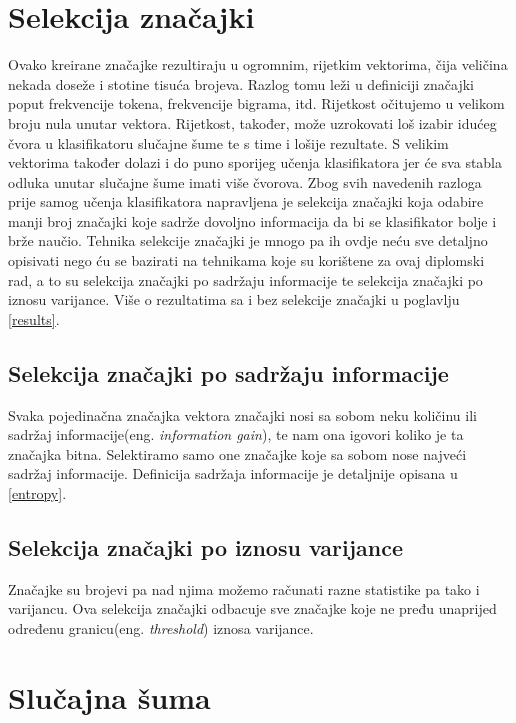 \section{Selekcija značajki}
Ovako kreirane značajke rezultiraju u ogromnim, rijetkim vektorima, čija veličina nekada doseže i stotine tisuća brojeva. Razlog tomu leži u definiciji značajki poput frekvencije tokena, frekvencije bigrama, itd. Rijetkost očitujemo u velikom broju nula unutar vektora. Rijetkost, također,  može uzrokovati loš izabir idućeg čvora u klasifikatoru slučajne šume te s time i lošije rezultate. S velikim vektorima također dolazi i do puno sporijeg učenja klasifikatora jer će sva stabla odluka unutar slučajne šume imati više čvorova. Zbog svih navedenih razloga prije samog učenja klasifikatora napravljena je selekcija značajki koja odabire manji broj značajki koje sadrže dovoljno informacija da bi se klasifikator bolje i brže naučio. Tehnika selekcije značajki je mnogo pa ih ovdje neću sve detaljno opisivati nego ću se bazirati na tehnikama koje su korištene za ovaj diplomski rad, a to su selekcija značajki po sadržaju informacije te selekcija značajki po iznosu varijance. Više o rezultatima sa i bez selekcije značajki u poglavlju \ref{results}.

\subsection{Selekcija značajki po sadržaju informacije}

Svaka pojedinačna značajka vektora značajki nosi sa sobom neku količinu ili sadržaj informacije(eng. \textit{information gain}), te nam ona igovori koliko je ta značajka bitna. Selektiramo samo one značajke koje sa sobom nose najveći sadržaj informacije. Definicija sadržaja informacije je detaljnije opisana u \ref{entropy}.

\subsection{Selekcija značajki po iznosu varijance}

Značajke su brojevi pa nad njima možemo računati razne statistike pa tako i varijancu. Ova selekcija značajki odbacuje sve značajke koje ne pređu unaprijed određenu granicu(eng. \textit{threshold}) iznosa varijance.

\section{Slučajna šuma}

